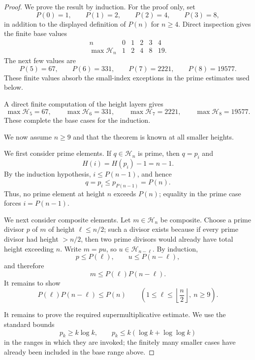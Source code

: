 \documentclass[11pt]{article}
\theoremstyle{definition}
\begin{document}
\begin{proof}
We prove the result by induction.  For the proof only, set
\[
  P(0)=1,\qquad P(1)=2,\qquad P(2)=4,\qquad P(3)=8,
\]
in addition to the displayed definition of $P(n)$ for $n\ge4$.  Direct
inspection gives the finite base values
\[
\begin{array}{c|ccccc}
n&0&1&2&3&4\\
\hline
\max\mathcal H_n&1&2&4&8&19.
\end{array}
\]
The next few values are
\[
  P(5)=67,\qquad P(6)=331,\qquad P(7)=2221,\qquad P(8)=19577.
\]
These finite values absorb the small-index exceptions in the prime estimates
used below.

A direct finite computation of the height layers gives
\[
\max\mathcal H_5=67,\qquad
\max\mathcal H_6=331,\qquad
\max\mathcal H_7=2221,\qquad
\max\mathcal H_8=19577.
\]
These complete the base cases for the induction.

We now assume $n\ge9$ and that the theorem is known at all smaller
heights.

We first consider prime elements.  If $q\in\mathcal H_n$ is prime, then $q=p_i$ and
\[
  H(i)=H(p_i)-1=n-1.
\]
By the induction hypothesis, $i\le P(n-1)$, and hence
\[
  q=p_i\le p_{P(n-1)}=P(n).
\]
Thus, no prime element at height $n$ exceeds $P(n)$; equality in the prime case
forces $i=P(n-1)$.

We next consider composite elements.  Let $m\in\mathcal H_n$ be composite.  Choose a prime divisor $p$ of $m$ of
height $\ell\le n/2$; such a divisor exists because if every prime divisor had
height $>n/2$, then two prime divisors would already have total height exceeding
$n$.  Write $m=pu$, so $u\in\mathcal H_{n-\ell}$.  By induction,
\[
  p\le P(\ell),
  \qquad
  u\le P(n-\ell),
\]
and therefore
\begin{equation*}
  m\le P(\ell)P(n-\ell).
\end{equation*}
It remains to show
\begin{equation}\label{eq:Matula-supermult-short}
  P(\ell)P(n-\ell)\le P(n)
  \qquad
  \left(1\le \ell\le \left\lfloor\frac n2\right\rfloor,\ n\ge9\right).
\end{equation}

It remains to prove the required supermultiplicative estimate.  We use the standard bounds
\[
  p_k\ge k\log k,
  \qquad
  p_k\le k(\log k+\log\log k)
\]
in the ranges in which they are invoked; the finitely many smaller cases have
already been included in the base range above.


\end{proof}
\end{document}
